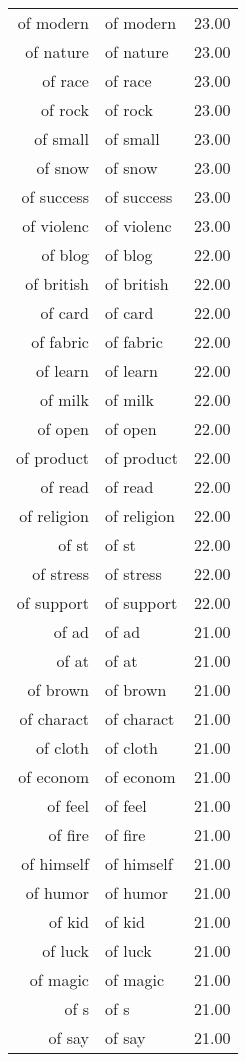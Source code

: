 \begin{table}[ht]
\begin{tabular}{rlr}
  of modern & of modern & 23.00 \\ 
  of nature & of nature & 23.00 \\ 
  of race & of race & 23.00 \\ 
  of rock & of rock & 23.00 \\ 
  of small & of small & 23.00 \\ 
  of snow & of snow & 23.00 \\ 
  of success & of success & 23.00 \\ 
  of violenc & of violenc & 23.00 \\ 
  of blog & of blog & 22.00 \\ 
  of british & of british & 22.00 \\ 
  of card & of card & 22.00 \\ 
  of fabric & of fabric & 22.00 \\ 
  of learn & of learn & 22.00 \\ 
  of milk & of milk & 22.00 \\ 
  of open & of open & 22.00 \\ 
  of product & of product & 22.00 \\ 
  of read & of read & 22.00 \\ 
  of religion & of religion & 22.00 \\ 
  of st & of st & 22.00 \\ 
  of stress & of stress & 22.00 \\ 
  of support & of support & 22.00 \\ 
  of ad & of ad & 21.00 \\ 
  of at & of at & 21.00 \\ 
  of brown & of brown & 21.00 \\ 
  of charact & of charact & 21.00 \\ 
  of cloth & of cloth & 21.00 \\ 
  of econom & of econom & 21.00 \\ 
  of feel & of feel & 21.00 \\ 
  of fire & of fire & 21.00 \\ 
  of himself & of himself & 21.00 \\ 
  of humor & of humor & 21.00 \\ 
  of kid & of kid & 21.00 \\ 
  of luck & of luck & 21.00 \\ 
  of magic & of magic & 21.00 \\ 
  of s & of s & 21.00 \\ 
  of say & of say & 21.00 \\ 

\end{tabular}
\end{table}
